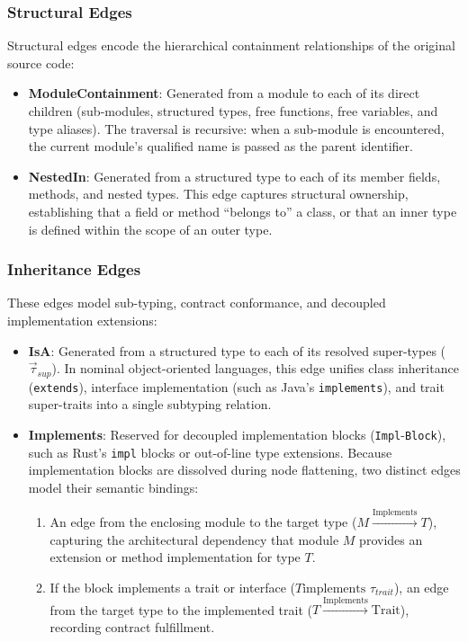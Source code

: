 \subsubsection{Structural Edges}
Structural edges encode the hierarchical containment relationships of
the original source code:
\begin{itemize}
  \item \textbf{ModuleContainment}: Generated from a module to each
    of its direct children (sub-modules, structured types, free
    functions, free variables, and type aliases). The traversal is
    recursive: when a sub-module is encountered, the current module's
    qualified name is passed as the parent identifier.
  \item \textbf{NestedIn}: Generated from a structured type to each
    of its member fields, methods, and nested types. This edge captures
    structural ownership, establishing that a field or method ``belongs to''
    a class, or that an inner type is defined within the scope of an outer type.
\end{itemize}

\subsubsection{Inheritance Edges}
These edges model sub-typing, contract conformance, and decoupled
implementation extensions:
\begin{itemize}
  \item \textbf{IsA}: Generated from a structured type to each of its
    resolved super-types ($\vec{\tau}_{sup}$). In nominal object-oriented
    languages, this edge unifies class inheritance (\texttt{extends}),
    interface implementation (such as Java's \texttt{implements}), and
    trait super-traits into a single subtyping relation.
  \item \textbf{Implements}: Reserved for decoupled implementation blocks
    (\texttt{Impl}-\linebreak\texttt{Block}), such as Rust's
    \texttt{impl} blocks or out-of-line
    type extensions. Because implementation blocks are dissolved during node
    flattening, two distinct edges model their semantic bindings:
    \begin{enumerate}
      \item An edge from the enclosing module to the target type
        ($M \xrightarrow{\text{Implements}} T$), capturing the architectural
        dependency that module $M$ provides an extension or method
        implementation
        for type $T$.
      \item If the block implements a trait or interface ($T \text{
        implements } \tau_{trait}$),
        an edge from the target type to the implemented trait
        ($T \xrightarrow{\text{Implements}} \text{Trait}$), recording
        contract fulfillment.
    \end{enumerate}
\end{itemize}

